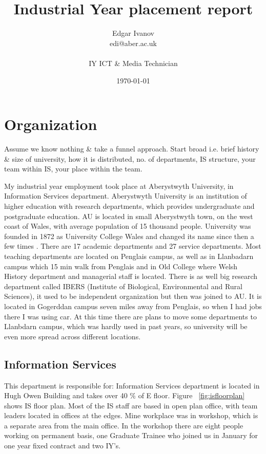 \documentclass[10pt,a4paper,headinclude=true]{report}
\begin{document}
\onehalfspacing
\title{Industrial Year placement report}
\author{Edgar Ivanov\\ edi@aber.ac.uk \\ \\ IY ICT \& Media Technician}
\date{\today}

\maketitle
\tableofcontents

\chapter{\textbf{Organization}}
Assume we know nothing \& take a funnel approach. Start broad i.e. brief history \&
size of university, how it is distributed, no. of departments, IS structure, your
team within IS, your place within the team.

My industrial year employment took place at Aberystwyth University, in Information Services department. Aberystwyth University is an institution of higher education with research departments, which provides undergraduate and postgraduate education. AU is located in small Aberystwyth town, on the west coast of Wales, with average population of 15 thousand people. University was founded in 1872 as University College Wales and changed its name since then a few times \cite{History}. There are 17 academic departments and 27 service departments. Most teaching departments are located on Penglais campus, as well as in Llanbadarn campus which 15 min walk from Penglais and in Old College where Welsh History department and managerial staff is located. There is as well big research department called IBERS (Institute of Biological, Environmental and Rural Sciences), it used to be independent organization but then was joined to AU. It is located in Gogerddan campus seven miles away from Penglais, so when I had jobs there I was using car. At this time there are plans to move some departments to Llanbdarn campus, which was hardly used in past years, so university will be even more spread across different locations.

\section{Information Services}
This department is responsible for: 
Information Services department is located in Hugh Owen Building and takes over 40 \% of E floor. Figure ~\ref{fig:isfloorplan} shows IS floor plan. Most of the IS staff are based in open plan office, with team leaders located in offices at the edges. Mine workplace was in workshop, which is a separate area from the main office. In the workshop there are eight people working on permanent basis, one Graduate Trainee who joined us in January for one year fixed contract and two IY's.
\end{document}
